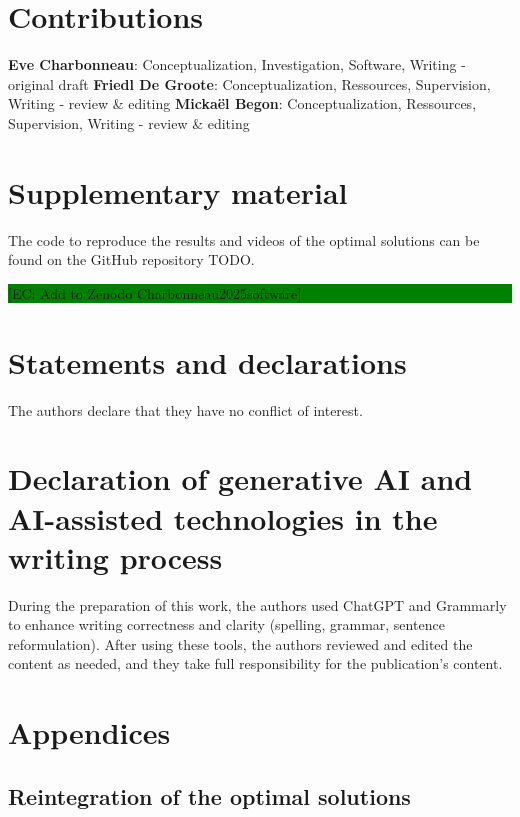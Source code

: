 \documentclass[10pt,letterpaper]{article}
\newcommand{\comEC}[1]{~\linebreak\noindent\colorbox{green}{\parbox{\dimexpr\columnwidth-1\fboxsep}{[EC: #1]}}}
\begin{document}
\section*{Contributions}
\textbf{Eve Charbonneau}: Conceptualization, Investigation, Software, Writing - original draft
\textbf{Friedl De Groote}: Conceptualization, Ressources, Supervision, Writing - review \& editing
\textbf{Micka\"{e}l Begon}: Conceptualization, Ressources, Supervision, Writing - review \& editing

\section*{Supplementary material}
The code to reproduce the results and videos of the optimal solutions can be found on the GitHub repository TODO.
\comEC{Add to Zenodo Charbonneau2025software}

\section*{Statements and declarations}
The authors declare that they have no conflict of interest.

\section*{Declaration of generative AI and AI-assisted technologies in the writing process}
During the preparation of this work, the authors used ChatGPT and Grammarly to enhance writing correctness and clarity (spelling, grammar, sentence reformulation). 
After using these tools, the authors reviewed and edited the content as needed, and they take full responsibility for the publication's content.


\nolinenumbers



\clearpage

\begingroup
\let\clearpage\relax 
\onecolumn 
\appendix
\section*{Appendices}
\renewcommand{\thesubsection}{\Alph{subsection}}

\subsection{Reintegration of the optimal solutions}\label{subsec:reintegration}
\setcounter{figure}{0}
\renewcommand\thefigure{A.\arabic{figure}}
\end{document}
